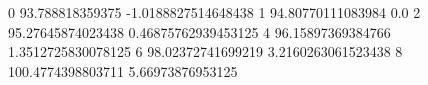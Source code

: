 0 93.788818359375 -1.0188827514648438
1 94.80770111083984 0.0
2 95.27645874023438 0.46875762939453125
4 96.15897369384766 1.3512725830078125
6 98.02372741699219 3.2160263061523438
8 100.4774398803711 5.66973876953125
